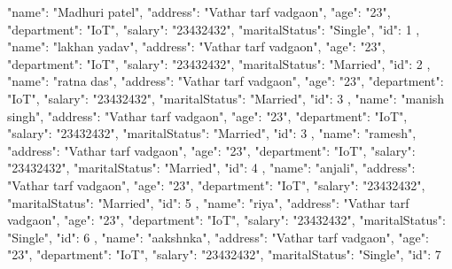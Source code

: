 {
      "name": "Madhuri patel",
      "address": "Vathar tarf vadgaon",
      "age": "23",
      "department": "IoT",
      "salary": "23432432",
      "maritalStatus": "Single",
      "id": 1
    },
    {
      "name": "lakhan yadav",
      "address": "Vathar tarf vadgaon",
      "age": "23",
      "department": "IoT",
      "salary": "23432432",
      "maritalStatus": "Married",
      "id": 2
    },
    {
      "name": "ratna das",
      "address": "Vathar tarf vadgaon",
      "age": "23",
      "department": "IoT",
      "salary": "23432432",
      "maritalStatus": "Married",
      "id": 3
    },
    {
      "name": "manish singh",
      "address": "Vathar tarf vadgaon",
      "age": "23",
      "department": "IoT",
      "salary": "23432432",
      "maritalStatus": "Married",
      "id": 3
    },
    {
      "name": "ramesh",
      "address": "Vathar tarf vadgaon",
      "age": "23",
      "department": "IoT",
      "salary": "23432432",
      "maritalStatus": "Married",
      "id": 4
    },
    {
      "name": "anjali",
      "address": "Vathar tarf vadgaon",
      "age": "23",
      "department": "IoT",
      "salary": "23432432",
      "maritalStatus": "Married",
      "id": 5
    },
    {
      "name": "riya",
      "address": "Vathar tarf vadgaon",
      "age": "23",
      "department": "IoT",
      "salary": "23432432",
      "maritalStatus": "Single",
      "id": 6
    },
    {
      "name": "aakshnka",
      "address": "Vathar tarf vadgaon",
      "age": "23",
      "department": "IoT",
      "salary": "23432432",
      "maritalStatus": "Single",
      "id": 7
    }